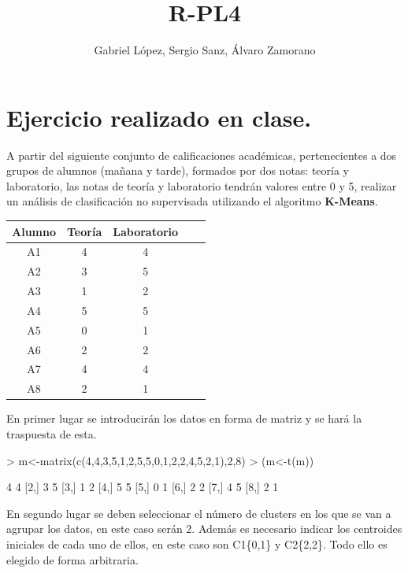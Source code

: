 \documentclass [a4paper] {article}
\title{R-PL4}
\author{Gabriel López, Sergio Sanz, Álvaro Zamorano}
\begin{document}


\maketitle

\graphicspath{ {./tmp/} }

\section{Ejercicio realizado en clase.}

\bigskip
A partir del siguiente conjunto de calificaciones académicas, pertenecientes a dos grupos de alumnos (mañana y tarde),
formados por dos notas: teoría y laboratorio, las notas de teoría y laboratorio tendrán valores entre 0 y 5, realizar
un análisis de clasificación no supervisada utilizando el algoritmo \textbf{K-Means}.

\begin{table}[H]
\begin{center}
\begin{tabular}{|c|c|c|c|c|}
\hline
Alumno & Teoría & Laboratorio\\
\hline \hline
A1 & 4 & 4 \\ \hline
A2 & 3 & 5 \\ \hline
A3 & 1 & 2 \\ \hline
A4 & 5 & 5 \\ \hline
A5 & 0 & 1 \\ \hline
A6 & 2 & 2 \\ \hline
A7 & 4 & 4 \\ \hline
A8 & 2 & 1 \\ \hline
\end{tabular}
\end{center}
\end{table}

En primer lugar se introducirán los datos en forma de matriz y se hará la traspuesta de esta.
\begin{Schunk}
\begin{Sinput}
> m<-matrix(c(4,4,3,5,1,2,5,5,0,1,2,2,4,5,2,1),2,8)
> (m<-t(m))
\end{Sinput}
\begin{Soutput}
     [,1] [,2]
[1,]    4    4
[2,]    3    5
[3,]    1    2
[4,]    5    5
[5,]    0    1
[6,]    2    2
[7,]    4    5
[8,]    2    1
\end{Soutput}
\end{Schunk}

\bigskip
En segundo lugar se deben seleccionar el número de clusters en los que se van a agrupar los datos,
en este caso serán 2. Además es necesario indicar los centroides iniciales de cada uno de ellos, en
este caso son C1\{0,1\} y C2\{2,2\}. Todo ello es elegido de forma arbitraria.
\end{document}
